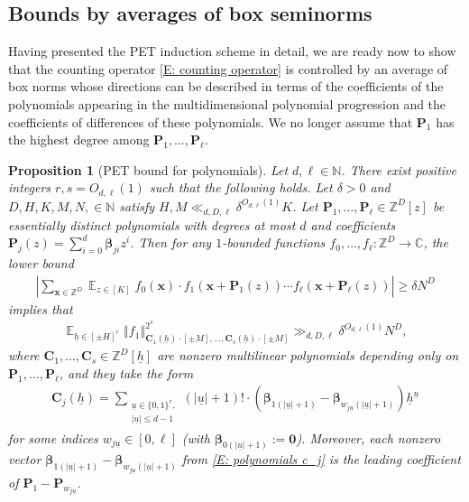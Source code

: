 \documentclass[11pt]{amsart}
\newtheorem{proposition}[lemma]{Proposition}
\theoremstyle{definition}
\DeclareMathOperator*{\E}{\mathbb{E}}
\newcommand{\C}{{\mathbb C}}
\newcommand{\N}{{\mathbb N}}
\newcommand{\Z}{{\mathbb Z}}
\newcommand{\bc}{{\textbf{C}}}
\newcommand{\bp}{{\textbf{P}}}
\newcommand{\p}{{\textbf{P}}}
\newcommand{\bx}{{\textbf{x}}}
\newcommand{\bbeta}{{\boldsymbol{\beta}}}
\newcommand{\uh}{{\underline{h}}}
\newcommand{\uu}{{\underline{u}}}
\newcommand{\norm}[1]{\left\Vert #1\right\Vert}
\newcommand{\abs}[1]{\mathopen{}\left| #1\mathclose{}\right|}
\begin{document}
    \subsection{Bounds by averages of box seminorms}\label{SS: PET bound}
    Having presented the PET induction scheme in detail, we are ready now to show that the counting operator \eqref{E: counting operator} is controlled by an average of box norms whose directions can be described in terms of the coefficients of the polynomials appearing in the multidimensional polynomial progression and the coefficients of differences of these polynomials. We no longer assume that $\p_1$ has the highest degree among $\p_1, \ldots, \p_\ell$.
		\begin{proposition}[PET bound for polynomials]\label{P: PET}
			Let $d, \ell\in\N$. There exist positive integers $r, s=O_{d, \ell}(1)$ such that the following holds.  Let $\delta>0$ and $D, H, K, M, N,\in\N$ satisfy $H, M\ll_{d, D, \ell}\delta^{O_{d, \ell}(1)} K$.  Let $\p_1, \ldots, \p_\ell\in\Z^D[z]$ be essentially distinct polynomials  with degrees at most $d$ and coefficients $\p_j(z) = \sum_{i=0}^d \bbeta_{ji} z^i$.
   Then for any $1$-bounded functions $f_0, \ldots,  f_\ell:\Z^D\to\C$, the lower bound  
			\begin{align*}%
            \abs{\sum_{\bx\in\Z^D}\E_{z\in[K]}
            f_0(\bx)\cdot f_1(\bx+\p_1(z))\cdots f_\ell(\bx+\p_\ell(z))} \geq \delta N^D
			\end{align*}
   implies that
   \begin{align*}
       \E_{\uh\in[\pm H]^{r}}\norm{f_1}_{{\bc_1(\uh)}\cdot[\pm M], \ldots, {\bc_s(\uh)\cdot[\pm M]}}^{2^s} \gg_{d, D, \ell} \delta^{O_{d,\ell}(1)}N^D,
   \end{align*}
			where $\bc_1, \ldots, \bc_s\in\Z^D[\uh]$ are nonzero multilinear polynomials depending only on $\bp_1, \ldots, \bp_\ell$, and they take the form
			\begin{align}\label{E: polynomials c_j}
				\bc_{j}(\uh) = \sum_{\substack{\uu\in \{0,1\}^{r},\\ |\uu|\leq d-1}} (|\uu|+1)! \cdot (\bbeta_{1(|\uu|+1)}-\bbeta_{w_{j\uu}(|\uu|+1)})\uh^\uu
			\end{align}
                for some indices $w_{j\uu}\in[0,\ell]$ (with $\bbeta_{0(|\uu|+1)}:=\mathbf{0}$). Moreover, each nonzero vector $\bbeta_{1(|\uu|+1)}-\bbeta_{w_{j\uu}(|\uu|+1)}$ from \eqref{E: polynomials c_j} is the leading coefficient of $\p_1 - \p_{w_{j\uu}}$.
  \end{proposition}
\end{document}
